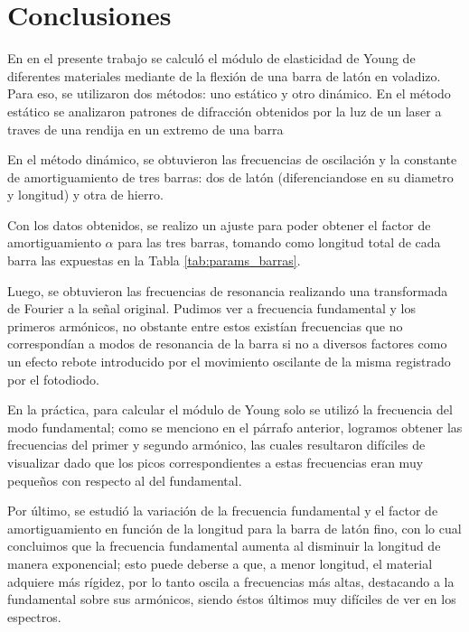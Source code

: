 \documentclass[twoside,twocolumn,a4paper]{article}
\begin{document}

\section{Conclusiones}

En en el presente trabajo se calcul\'o el m\'odulo de elasticidad de Young de diferentes materiales mediante de la flexi\'on de una barra de lat\'on en voladizo. Para eso, se utilizaron dos m\'etodos: uno est\'atico y otro din\'amico. En el m\'etodo est\'atico se analizaron patrones de difracci\'on obtenidos por la luz de un laser a traves de una rendija en un extremo de una barra





En el m\'etodo din\'amico, se obtuvieron las frecuencias de oscilaci\'on y la constante de amortiguamiento de tres barras: dos de lat\'on (diferenciandose en su diametro y longitud) y otra de hierro. 

Con los datos obtenidos, se realizo un ajuste para poder obtener el factor de amortiguamiento $\alpha$ para las tres barras, tomando como longitud total de cada barra las expuestas en la Tabla \ref{tab:params_barras}.

Luego, se obtuvieron las frecuencias de resonancia realizando una transformada de Fourier a la se\~nal original. Pudimos ver a frecuencia fundamental y los primeros arm\'onicos, no obstante entre estos exist\'ian frecuencias que no correspond\'ian a modos de resonancia de la barra si no a diversos factores como un efecto rebote introducido por el movimiento oscilante de la misma registrado por el fotodiodo. \newline

En la pr\'actica, para calcular el m\'odulo de Young solo se utiliz\'o la frecuencia del modo fundamental; como se menciono en el p\'arrafo anterior, logramos obtener las frecuencias del primer y segundo arm\'onico, las cuales resultaron dif\'iciles de visualizar dado que los picos correspondientes a estas frecuencias eran muy peque\~nos con respecto al del fundamental. \newline

Por \'ultimo, se estudi\'o la variaci\'on de la frecuencia fundamental y el factor de amortiguamiento en funci\'on de la longitud para la barra de lat\'on fino, con lo cual concluimos que
la frecuencia fundamental aumenta al disminuir la longitud de manera exponencial; esto puede deberse a que, a menor longitud, el material adquiere m\'as r\'igidez, por lo tanto oscila a frecuencias m\'as altas, destacando a la fundamental sobre sus arm\'onicos, siendo \'estos \'ultimos muy dif\'iciles de ver en los espectros. \newline
\end{document}
